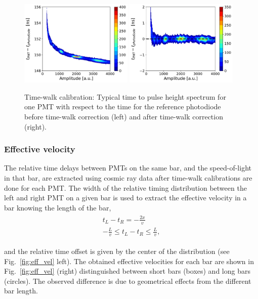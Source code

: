 \documentclass[3p,final,twocolumn]{elsarticle}
\begin{document}
\begin{figure}[tbh]
	\centering
		\includegraphics[width=0.48\textwidth]{timewalkpre.pdf}
		\includegraphics[width=0.48\textwidth]{timewalkpost.pdf}
	\caption{Time-walk calibration: Typical time to pulse height spectrum for one PMT with respect to the time for the reference photodiode before time-walk correction (left) and after time-walk correction (right).}
	\label{fig:time_walk}
\end{figure}

\subsubsection{Effective velocity}
The relative time delays between PMTs on the same bar, and the speed-of-light in that bar, are extracted using cosmic ray 
data after time-walk calibrations are done for each PMT. The width of the relative timing distribution between the left and 
right PMT on a given bar is used to extract the effective velocity in a bar knowing the length of the bar,
\begin{eqnarray}
	\begin{split}
		t_L - t_R 	= -\frac{2x}{v}							\\
		 -\frac{L}{v}	\leq 	t_L - t_R 	\leq \frac{L}{v},				
		 \label{eqn:eff_vel}
	\end{split}
\end{eqnarray}

and the relative time offset is given by the center of the distribution (see Fig.~\ref{fig:eff_vel} left). The obtained effective velocities for each bar are shown in Fig.~\ref{fig:eff_vel} (right) distinguished between short bars (boxes) and long bars (circles). The observed difference is due to geometrical effects from the different bar length.
\end{document}
